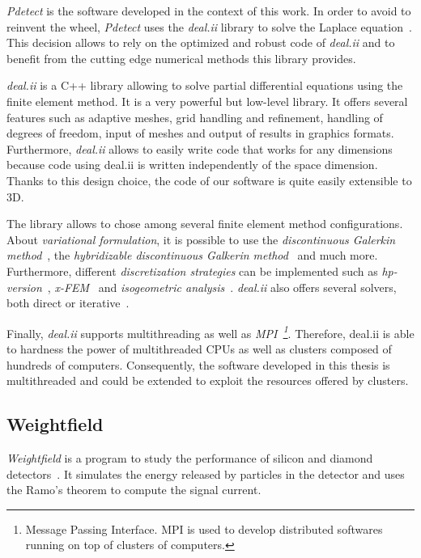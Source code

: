 \documentclass[11pt]{article}
\begin{document}
	  \textit{Pdetect} is the software developed in the context of this work.
		In order to avoid to reinvent the wheel, \textit{Pdetect} uses the \textit{deal.ii} library
		to solve the Laplace equation~\cite{Bangerth:2007:DGO:1268776.1268779}. This decision allows to rely on the optimized
		and robust code of \textit{deal.ii} and to benefit from the cutting edge numerical methods this library provides.

		\textit{deal.ii} is a C++ library allowing to solve partial differential equations
		using the finite element method. It is a very powerful but low-level library.
		It offers several features such as adaptive meshes, grid handling
		and refinement, handling of degrees of freedom, input of meshes and output of results in
		graphics formats. Furthermore, \textit{deal.ii} allows to easily write code that works
		for any dimensions because code using deal.ii is written independently of the space
		dimension. Thanks to this design choice, the code of our software is quite easily
		extensible to 3D.


		The library allows to chose among several finite element method configurations.
		About \textit{variational formulation}, it is possible to use the
		\textit{discontinuous Galerkin method}~\cite{dealii_Galerkin},
		the \textit{hybridizable discontinuous Galkerin method}~\cite{dealii_Galerkin_hybrid} and much more.
		Furthermore, different \textit{discretization strategies} can be implemented such as
		\textit{hp-version}~\cite{hp_fem}, \textit{x-FEM}~\cite{CarraroWetterauer:2015}
		and \textit{isogeometric analysis}~\cite{dealII83}. \textit{deal.ii} also
		offers several solvers, both direct or iterative~\cite{deal.ii.solvers}.


		Finally, \textit{deal.ii} supports multithreading as well as \textit{MPI~\footnote{Message
		Passing Interface. MPI is used to develop distributed softwares running on top of
		clusters of computers.}}. Therefore,
		deal.ii is able to hardness the power of multithreaded CPUs as well as
		clusters composed of hundreds of computers. Consequently,
		the software developed in this thesis is multithreaded and could be extended to
		exploit the resources offered by clusters.

	\subsection{Weightfield}

		\textit{Weightfield} is a program to study the performance of silicon and diamond
		detectors~\cite{Cenna2015}. It simulates the energy released by particles in the detector
		and uses the Ramo's theorem to compute the signal current.
\end{document}
